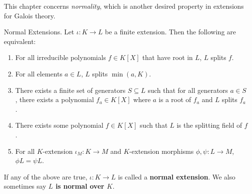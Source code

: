 \documentclass[../book.tex]{subfiles}
\begin{document}
This chapter concerns \emph{normality},
which is another desired property in extensions for Galois theory. 
\begin{dfn} Normal Extensions. 
    Let $\iota : K \to L$ be a finite extension. 
    Then the following are equivalent: 
    \begin{enumerate}
        \item For all irreducible polynomials $f \in K[X]$ that have root in $L$,
        $L$ splits $f$. 
        \item For all elements $a \in L$, $L$ splits $\min(a,K)$. 
        \item There exists a finite set of generators $S \subseteq L$ such that
        for all generators $a\in S$, there exists a polynomial $f_a \in K[X]$
        where $a$ is a root of $f_a$ and $L$ splits $f_a$.
        \item There exists some polynomial $f \in K[X]$ such that 
        $L$ is the splitting field of $f$. 
        \item For all $K$-extension $\iota_M : K \to M$ and 
        $K$-extension morphisms $\phi, \psi : L \to M$, $\phi L = \psi L$. 
    \end{enumerate}
    If any of the above are true, 
    $\iota : K \to L$ is called a \textbf{normal extension}.
    We also sometimes say \textbf{$L$ is normal over $K$}. 
\end{dfn}
\end{document}
